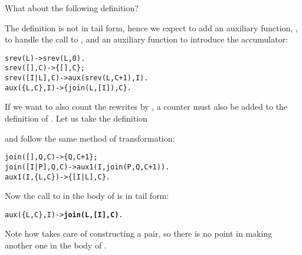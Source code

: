 What about the following definition?

The definition is not in tail form, hence we expect to add an
auxiliary function, , to handle the call to
, and an auxiliary function  to
introduce the accumulator:
\begin{alltt}
srev(L)       -> srev(L,0).
srev(   [],C) -> \{[],C\};
srev([I|L],C) -> aux(srev(L,C+1),I).
aux(\{L,C\},I)  -> \{join(L,[I]),C\}.
\end{alltt}
If we want to also count the rewrites by , a counter
must also be added to the definition of . Let us take
the definition

and follow the same method of transformation:
\begin{alltt}
join(   [],Q,C) -> \{Q,C+1\};
join([I|P],Q,C) -> aux1(I,join(P,Q,C+1)).
aux1(I,\{L,C\})   -> \{[I|L],C\}.
\end{alltt}
Now the call to  in the body of  is in
tail form:
\begin{alltt}
aux(\{L,C\},I)    -> \textbf{join(L,[I],C)}.
\end{alltt}
Note how  takes care of constructing a pair, so there
is no point in making another one in the body of .

